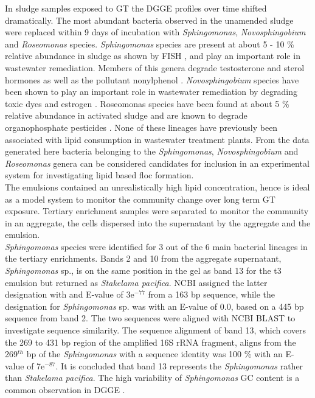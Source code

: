\documentclass[twoside]{article}
\begin{document}
In sludge samples exposed to GT the DGGE profiles over time shifted dramatically. The most abundant bacteria observed in the unamended sludge were replaced within 9 days of incubation with \emph{Sphingomonas}, \emph{Novosphingobium} and \emph{Roseomonas} species.
\emph{Sphingomonas} species are present at about 5 - 10 \% relative abundance in sludge as shown by FISH \cite{neef1999detection}, and play an important role in wastewater remediation. Members of this genera degrade testosterone and sterol hormones as well as the pollutant nonylphenol \cite{fujii2001sphingomonas,roh201017beta}. \emph{Novosphingobium} species have been shown to play an important role in wastewater remediation by degrading toxic dyes and estrogen \cite{addison2007novosphingobium,hashimoto2009contribution}.
Roseomonas species have been found at about 5 \% relative abundance in activated sludge and are known to degrade organophosphate pesticides \cite{jiang2008bacterial,jiang2006isolation}. None of these lineages have previously been associated with lipid consumption in wastewater treatment plants. From the data generated here bacteria belonging to the \emph{Sphingomonas}, \emph{Novosphingobium} and \emph{Roseomonas} genera can be considered candidates for inclusion in an experimental system for investigating lipid based floc formation. \\


The emulsions contained an unrealistically high lipid concentration, hence is ideal as a model system to monitor the community change over long term GT exposure.
Tertiary enrichment samples were separated to monitor the community in an aggregate, the cells dispersed into the supernatant by the aggregate and the emulsion. \\



\emph{Sphingomonas} species were identified for 3 out of the 6 main bacterial lineages in the tertiary enrichments. Bands 2 and 10 from the aggregate supernatant, \emph{Sphingomonas} sp., is on the same position in the gel as band 13 for the t3 emulsion but returned as \emph{Stakelama pacifica}.
NCBI assigned the latter designation with and E-value of 3e$^{-77}$ from a 163 bp sequence, while the designation for \emph{Sphingomonas} sp. was with an E-value of 0.0, based on a 445 bp sequence from band 2. The two sequences were aligned with NCBI BLAST to investigate sequence similarity. The sequence alignment of band 13, which covers the 269 to 431 bp region of the amplified 16S rRNA fragment, aligns from the 269$^{th}$ bp of the \emph{Sphingomonas} with a sequence identity was 100 \% with an E-value of 7e$^{-87}$. It is concluded that band 13 represents the \emph{Sphingomonas} rather than \emph{Stakelama pacifica}.
The high variability of \emph{Sphingomonas} GC content is a common observation in DGGE \cite{qiao2012effect}.\\
\end{document}
